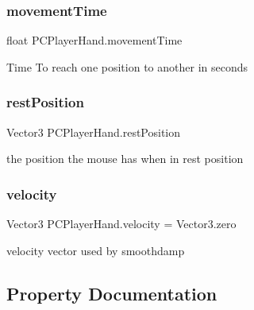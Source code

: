 \subsubsection{\texorpdfstring{movement\+Time}{movementTime}}
{\footnotesize\ttfamily float P\+C\+Player\+Hand.\+movement\+Time\hspace{0.3cm}{\ttfamily [private]}}



Time To reach one position to another in seconds 

\mbox{\label{class_p_c_player_hand_a67a82329e791c5fce99188ba601e229d}} 
\subsubsection{\texorpdfstring{rest\+Position}{restPosition}}
{\footnotesize\ttfamily Vector3 P\+C\+Player\+Hand.\+rest\+Position\hspace{0.3cm}{\ttfamily [private]}}



the position the mouse has when in rest position 

\mbox{\label{class_p_c_player_hand_a15c7717a137aa7790c06f2bdf9b247a1}} 
\subsubsection{\texorpdfstring{velocity}{velocity}}
{\footnotesize\ttfamily Vector3 P\+C\+Player\+Hand.\+velocity = Vector3.\+zero\hspace{0.3cm}{\ttfamily [private]}}



velocity vector used by smoothdamp 



\subsection{Property Documentation}
\mbox{\label{class_p_c_player_hand_a8c3efd819803169fc351ce8e456a8a0f}} 
